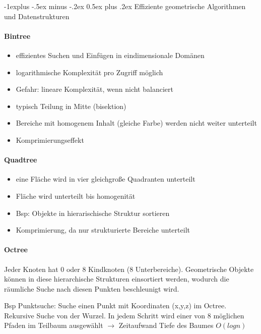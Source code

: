 \documentclass[10pt,landscape]{article}
\makeatletter
\renewcommand{\subsection}{\@startsection{subsection}{2}{0mm}%
                                {-1explus -.5ex minus -.2ex}%
                                {0.5ex plus .2ex}%
                                {\normalfont\normalsize\bfseries}}
\makeatother
\begin{document}
\begin{multicols}{3}
  \subsection{Effiziente geometrische Algorithmen und Datenstrukturen}
  \paragraph{Bintree}
  \begin{itemize}
    \item effizientes Suchen und Einfügen in eindimensionale Domänen
    \item logarithmische Komplexität pro Zugriff möglich
    \item Gefahr: lineare Komplexität, wenn nicht balanciert
    \item typisch Teilung in Mitte (bisektion)
    \item Bereiche mit homogenem Inhalt (gleiche Farbe) werden nicht weiter unterteilt
    \item Komprimierungseffekt
  \end{itemize}
  
  \paragraph{Quadtree}
  \begin{itemize}
    \item eine Fläche wird in vier gleichgroße Quadranten unterteilt
    \item Fläche wird unterteilt bis homogenität
    \item Bsp: Objekte in hierarischische Struktur sortieren
    \item Komprimierung, da nur strukturierte Bereiche unterteilt
  \end{itemize}
  
  \paragraph{Octree}
  Jeder Knoten hat 0 oder 8 Kindknoten (8 Unterbereiche). Geometrische Objekte können in diese hierarchische Strukturen einsortiert werden, wodurch die räumliche Suche nach diesen Punkten beschleunigt wird.
  
  Bsp Punktsuche: Suche einen Punkt mit Koordinaten (x,y,z) im Octree. Rekursive Suche von der Wurzel. In jedem Schritt wird einer von 8 möglichen Pfaden im Teilbaum ausgewählt $\rightarrow$ Zeitaufwand Tiefe des Baumes $O(log n)$
  

\end{multicols}
\end{document}
